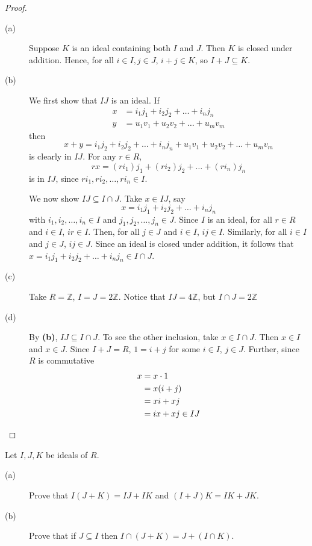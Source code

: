 \documentclass[12pt,leqno]{book}
\numberwithin{equation}{section}
\newcommand{\question}[2] {\vspace{.25in}\noindent\fbox{#1} #2 \vspace{.10in}}
\theoremstyle{definition}
\begin{document}
\begin{proof}\indent
 \begin{description}
  \item [(a)] Suppose $K$ is an ideal containing both $I$ and $J$. Then $K$ is closed under addition. Hence, for all $i\in I, j\in J$, $i+j\in K$, so $I+J\subseteq K$.
  \item [(b)] We first show that $IJ$ is an ideal. If \begin{align*}x&=i_1j_1+i_2j_2+\hdots+i_nj_n\\y&=u_1v_1+u_2v_2+\hdots+u_mv_m\end{align*} then \[x+y=i_1j_2+i_2j_2+\hdots+i_nj_n+u_1v_1+u_2v_2+\hdots+u_mv_m\] is clearly in $IJ$. For any $r\in R$, \[rx=(ri_1)j_1+(ri_2)j_2+\hdots+(ri_n)j_n\] is in $IJ$, since $ri_1,ri_2,\hdots,ri_n\in I$. 

 We now show $IJ\subseteq I\cap J$. Take $x\in IJ$, say \[x=i_1j_1+i_2j_2+\hdots+i_nj_n\] with $i_1,i_2,\hdots,i_n\in I$ and $j_1,j_2,\hdots,j_n\in J$. Since $I$ is an ideal, for all $r\in R$ and $i\in I$, $ir\in I$. Then, for all $j\in J$ and $i\in I$, $ij\in I$. Similarly, for all $i\in I$ and $j\in J$, $ij\in J$. Since an ideal is closed under addition, it follows that $x=i_1j_1+i_2j_2+\hdots+i_nj_n\in I\cap J$. 
  \item [(c)] Take $R=\mathbb{Z}$, $I=J=2\mathbb{Z}$. Notice that $IJ=4\mathbb{Z}$, but $I\cap J=2\mathbb{Z}$
  \item [(d)] By \textbf{(b)}, $IJ\subseteq I\cap J$. To see the other inclusion, take $x\in I\cap J$. Then $x\in I$ and $x\in J$. Since $I+J=R$, $1=i+j$ for some $i\in I$, $j\in J$. Further, since $R$ is commutative \begin{align*}x&=x\cdot1\\&=x(i+j)\\&=xi+xj\\&=ix+xj\in IJ\qedhere\end{align*}
 \end{description}

\end{proof}


\question{35.}{Let $I,J,K$ be ideals of $R$.}
\begin{description}
 \item [(a)] Prove that $I(J+K)=IJ+IK$ and $(I+J)K=IK+JK$.
 \item [(b)] Prove that if $J\subseteq I$ then $I\cap(J+K)=J+(I\cap K)$.
\end{description}
\end{document}
